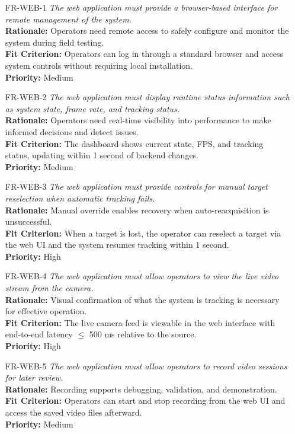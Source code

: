 \documentclass[12pt]{article}
\begin{document}
\begin{itemize}
  \item[FR-WEB-1] \emph{The web application must provide a browser-based interface for
          remote management of the system.}\\[2mm]
        {\bf Rationale:} Operators need remote access to safely configure and monitor the system during field testing.\\
        {\bf Fit Criterion:} Operators can log in through a standard browser and access system controls without requiring local installation.\\
        {\bf Priority:} Medium

  \item[FR-WEB-2] \emph{The web application must display runtime status information
          such as system state, frame rate, and tracking status.}\\[2mm]
        {\bf Rationale:} Operators need real-time visibility into performance to make informed decisions and detect issues.\\
        {\bf Fit Criterion:} The dashboard shows current state, FPS, and tracking status, updating within 1 second of backend changes.\\
        {\bf Priority:} Medium

  \item[FR-WEB-3] \emph{The web application must provide controls for manual target
          reselection when automatic tracking fails.}\\[2mm]
        {\bf Rationale:} Manual override enables recovery when auto-reacquisition is unsuccessful.\\
        {\bf Fit Criterion:} When a target is lost, the operator can reselect a target via the web UI and the system resumes tracking within 1 second.\\
        {\bf Priority:} High

  \item[FR-WEB-4] \emph{The web application must allow operators to view the live video
          stream from the camera.}\\[2mm]
        {\bf Rationale:} Visual confirmation of what the system is tracking is necessary for effective operation.\\
        {\bf Fit Criterion:} The live camera feed is viewable in the web interface with end-to-end latency $\leq$ 500 ms relative to the source.\\
        {\bf Priority:} High

  \item[FR-WEB-5] \emph{The web application must allow operators to record video
          sessions for later review.}\\[2mm]
        {\bf Rationale:} Recording supports debugging, validation, and demonstration.\\
        {\bf Fit Criterion:} Operators can start and stop recording from the web UI and access the saved video files afterward.\\
        {\bf Priority:} Medium


\end{itemize}
\end{document}
